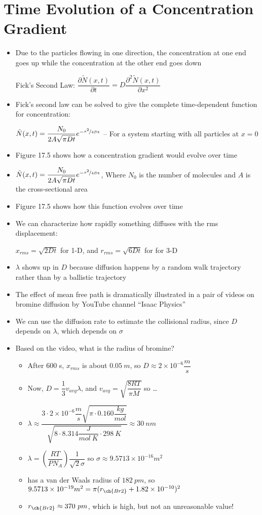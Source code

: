 \documentclass[12pt, openany, letterpaper]{memoir}
\begin{document}
\section*{Time Evolution of a Concentration Gradient}
\begin{itemize}
	\item Due to the particles flowing in one direction, the concentration at one end goes up while the concentration at the other end goes down
	
	Fick's Second Law: $\dfrac{\partial \tilde{N}(x,t)}{\partial t} = D\dfrac{\partial^2\tilde{N}(x,t)}{\partial x^2}$	
	\item Fick's second law can be solved to give the complete time-dependent function for concentration:
	
	$\tilde{N}(x,t)=\dfrac{N_0}{2A\sqrt{\pi Dt}}e^{-\nicefrac{x^2}{4Dt}}$ -- For a system starting with all particles at $x=0$
	\item Figure 17.5 shows how a concentration gradient would evolve over time
	\item $\tilde{N}(x,t)=\dfrac{N_0}{2A\sqrt{\pi Dt}}e^{-\nicefrac{x^2}{4Dt}}$, Where $N_0$ is the number of molecules and $A$ is the cross-sectional area
	\item Figure 17.5 shows how this function evolves over time
	\item We can characterize how rapidly something diffuses with the rms displacement:
	
	$x_{rms} = \sqrt{2Dt}$ for 1-D, and $r_{rms} = \sqrt{6Dt}$ for for 3-D
	\item $\lambda$ shows up in $D$ because diffusion happens by a random walk trajectory rather than by a ballistic trajectory
	\item The effect of mean free path is dramatically illustrated in a pair of videos on bromine diffusion by YouTube channel ``Isaac Physics''
	\item We can use the diffusion rate to estimate the collisional radius, since $D$ depends on $\lambda$, which depends on $\sigma$
	\item Based on the video, what is the radius of bromine?
	\begin{itemize} 
		\item After 600 s, $x_{rms}$ is about $0.05~m$, so $D \approx 2\times10^{-6}\dfrac{m}{s}$
		\item Now, $D=\dfrac{1}{3}v_{avg}\lambda$, and $v_{avg}=\sqrt{\dfrac{8RT}{\pi M}}$ so \ldots 
		\item $\lambda \approx \dfrac{3\cdot2\times10^{-6}\dfrac{m}{s}\sqrt{\pi\cdot0.160\dfrac{kg}{mol}}}{\sqrt{8\cdot8.314\dfrac{J}{mol~K}\cdot298~K}}\approx 30~nm$
		\item $\lambda = \left(\dfrac{RT}{PN_A}\right)\dfrac{1}{\sqrt{2}\sigma}$ so $\sigma \approx 9.5713\times10^{-16}m^2$
		\item {} has a van der Waals radius of $182~pm$, so $9.5713\times10^{-19}m^2 = \pi(r_{\ch{Br2}}+1.82\times10^{-10})^2$
		\item $r_{\ch{Br2}} \approx 370~pm$, which is high, but not an unreasonable value! 
	\end{itemize}
\end{itemize}
\end{document}
